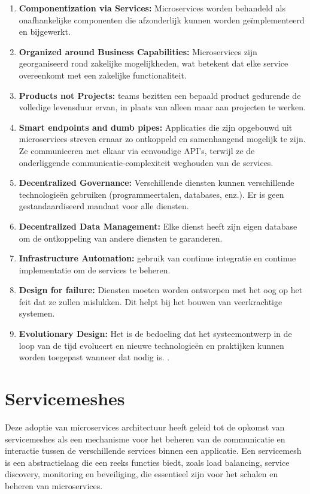 \begin{enumerate}
	\item \textbf{Componentization via Services:} Microservices worden behandeld als onafhankelijke componenten die afzonderlijk kunnen worden geïmplementeerd en bijgewerkt.
	
	\item \textbf{Organized around Business Capabilities:} Microservices zijn georganiseerd rond zakelijke mogelijkheden, wat betekent dat elke service overeenkomt met een zakelijke functionaliteit.
	
	\item \textbf{Products not Projects:} teams bezitten een bepaald product gedurende de volledige levensduur ervan, in plaats van alleen maar aan projecten te werken.
	
	\item \textbf{Smart endpoints and dumb pipes:} Applicaties die zijn opgebouwd uit microservices streven ernaar zo ontkoppeld en samenhangend mogelijk te zijn. Ze communiceren met elkaar via eenvoudige API’s, terwijl ze de onderliggende communicatie-complexiteit weghouden van de services. 
	
	\item \textbf{Decentralized Governance:} Verschillende diensten kunnen verschillende technologieën gebruiken (programmeertalen, databases, enz.). Er is geen gestandaardiseerd mandaat voor alle diensten.
	
	\item \textbf{Decentralized Data Management:} Elke dienst heeft zijn eigen database om de ontkoppeling van andere diensten te garanderen.
	
	\item \textbf{Infrastructure Automation:} gebruik van continue integratie en continue implementatie om de services te beheren.
	
	\item \textbf{Design for failure:} Diensten moeten worden ontworpen met het oog op het feit dat ze zullen mislukken. Dit helpt bij het bouwen van veerkrachtige systemen.
	
	\item \textbf{Evolutionary Design:} Het is de bedoeling dat het systeemontwerp in de loop van de tijd evolueert en nieuwe technologieën en praktijken kunnen worden toegepast wanneer dat nodig is. \autocite{Fowler2014}.
\end{enumerate}

\section{Servicemeshes}
Deze adoptie van microservices architectuur heeft geleid tot de opkomst van servicemeshes als een mechanisme voor het beheren van de communicatie en interactie tussen de verschillende services binnen een applicatie. Een servicemesh is een abstractielaag die een reeks functies biedt, zoals load balancing, service discovery, monitoring en beveiliging, die essentieel zijn voor het schalen en beheren van microservices.


